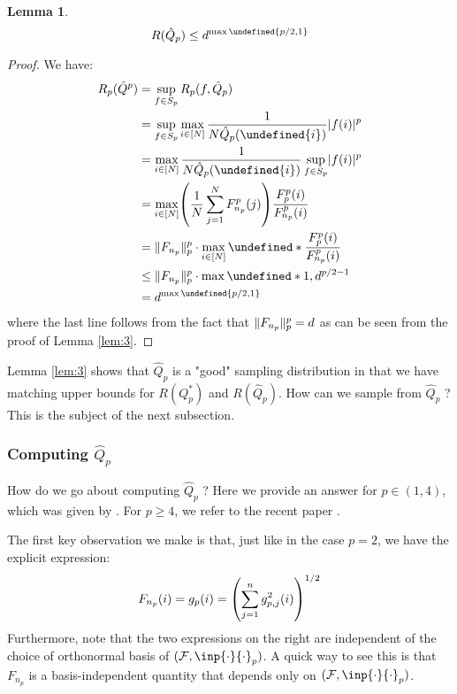 \documentclass{article}
\theoremstyle{plain}
\newtheorem{lemma}{Lemma}
\theoremstyle{definition}
\theoremstyle{remark}
\let\brace\undefined
\DeclarePairedDelimiter{\brace}{\lbrace}{\rbrace}
\DeclarePairedDelimiter{\paren}{\lparen}{\rparen}
\DeclarePairedDelimiter{\abs}{\lvert}{\rvert}
\DeclarePairedDelimiter{\norm}{\lVert}{\rVert}
\begin{document}
\begin{lemma}
\label{lem:4}
    \begin{equation*}
        R(\hat{Q}_p) \leq d^{\max{\brace{p/2, 1}}}
    \end{equation*}
\end{lemma}
\begin{proof}
    We have:
    \begin{align*}
        R_p(\hat{Q}^p) &= \sup_{f \in S_p} R_p(f, \hat{Q}_p) \\
        &= \sup_{f \in S_p} \max_{i \in [N]} \frac{1}{N \hat{Q}_p(\brace{i})} \abs{f(i)}^p \\
        &= \max_{i \in [N]} \frac{1}{N\hat{Q}_p(\brace{i})} \sup_{f \in S_p} \abs{f(i)}^p \\
        &= \max_{i \in [N]} \paren*{\frac{1}{N} \sum_{j=1}^{N} F_{n_p}^p(j)} \frac{F_p^p(i)}{F^{p}_{n_p}(i)} \\
        &= \norm{F_{n_p}}_p^p \cdot \max_{i \in [N]} \brace*{\frac{F_p^p(i)}{F^{p}_{n_p}(i)}} \\
        &\leq \norm{F_{n_p}}_p^p \cdot \max{\brace*{1, d^{p/2 - 1}}} \\
        &= d^{\max{\brace{p/2, 1}}}
    \end{align*}
    where the last line follows from the fact that $\norm{F_{n_p}}_p^p = d$ as can be seen from the proof of Lemma \ref{lem:3}.
\end{proof}

Lemma \ref{lem:3} shows that $\hat{Q}_{p}$ is a "good" sampling distribution in that we have matching upper bounds for $R(Q_p^*)$ and $R(\hat{Q}_p)$. How can we sample from $\hat{Q}_p$ ? This is the subject of the next subsection.

\subsubsection{Computing $\hat{Q}_p$}
How do we go about computing $\hat{Q}_p$ ? Here we provide an answer for $p \in (1 ,4)$, which was given by \cite{cohen2015lp}. For $p \geq 4$, we refer to the recent paper \cite{fazel2022computing}.

The first key observation we make is that, just like in the case $p=2$, we have the explicit expression:
\begin{equation}
\label{eq:1}
    F_{n_p}(i) = g_{p}(i) = \paren*{\sum_{j=1}^{n} g_{p, j}^{2}(i)}^{1/2}
\end{equation}
Furthermore, note that the two expressions on the right are independent of the choice of orthonormal basis of $(\mathcal{F}, \inp{\cdot}{\cdot}_p)$. A quick way to see this is that $F_{n_p}$ is a basis-independent quantity that depends only on $(\mathcal{F}, \inp{\cdot}{\cdot}_p)$.
\end{document}
